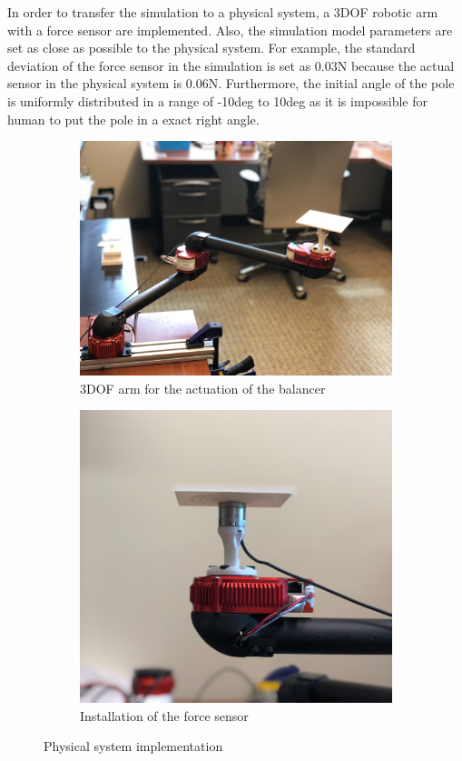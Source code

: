 \documentclass{article}
\begin{document}
In order to transfer the simulation to a physical system, a 3DOF robotic arm with a force sensor are implemented. Also, the simulation model parameters are set as close as possible to the physical system. For example, the standard deviation of the force sensor in the simulation is set as 0.03N because the actual sensor in the physical system is 0.06N. Furthermore, the initial angle of the pole is uniformly distributed in a range of -10deg to 10deg as it is impossible for human to put the pole in a exact right angle.  

\begin{figure}[h!]
  \centering
  \begin{subfigure}[b]{0.5\linewidth}
    \includegraphics[width=\linewidth]{./Figures/balancer_arm.jpg}
    \caption{3DOF arm for the actuation of the balancer}
  \end{subfigure}
  \begin{subfigure}[b]{0.4\linewidth}
    \includegraphics[width=\linewidth]{./Figures/balancer_sensor.jpg}
    \caption{Installation of the force sensor}
  \end{subfigure}
  \caption{Physical system implementation}
  \label{fig:pole}
\end{figure}
\end{document}
